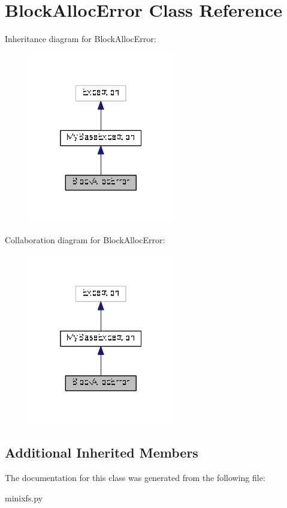 \hypertarget{classminixfs_1_1_block_alloc_error}{}\section{Block\+Alloc\+Error Class Reference}
\label{classminixfs_1_1_block_alloc_error}


Inheritance diagram for Block\+Alloc\+Error\+:
\nopagebreak
\begin{figure}[H]
\begin{center}
\leavevmode
\includegraphics[width=181pt]{classminixfs_1_1_block_alloc_error__inherit__graph}
\end{center}
\end{figure}


Collaboration diagram for Block\+Alloc\+Error\+:
\nopagebreak
\begin{figure}[H]
\begin{center}
\leavevmode
\includegraphics[width=181pt]{classminixfs_1_1_block_alloc_error__coll__graph}
\end{center}
\end{figure}
\subsection*{Additional Inherited Members}


The documentation for this class was generated from the following file\+:\begin{DoxyCompactItemize}
\item 
minixfs.\+py\end{DoxyCompactItemize}
